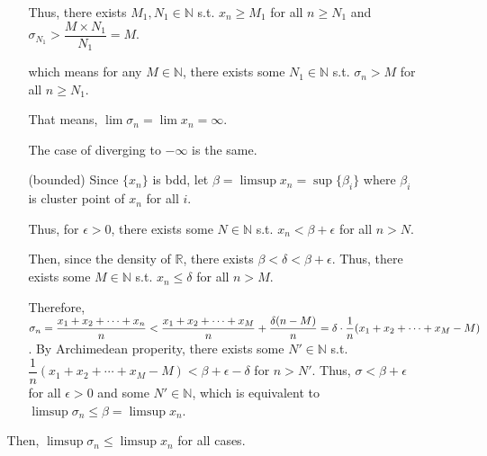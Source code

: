 \documentclass[12pt]{article}
\begin{document}
\begin{enumerate}
\begin{enumerate}[(a)]
\begin{enumerate}
            Thus, there exists $M_1, N_1 \in \mathbb{N}$ s.t. $x_n \geq M_1$ for all $n \geq N_1$ and $\sigma_{N_1} > \dfrac{M\times N_1}{N_1} = M$.

            which means for any $M \in \mathbb{N}$, there exists some $N_1 \in \mathbb{N}$ s.t. $\sigma_n > M$ for all $n \geq N_1$.

            That means, $\lim \sigma_n = \lim x_n = \infty$.

            The case of diverging to $-\infty$ is the same.

            \item[(bounded)] Since $\lbrace x_n\rbrace$ is bdd, let $\beta = \limsup x_n = \sup\lbrace \beta_i\rbrace$ where $\beta_i$ is cluster point of $x_n$ for all $i$.
            
            Thus, for $\epsilon > 0$, there exists some $N \in \mathbb{N}$ s.t. $x_n < \beta + \epsilon$ for all $n > N$.

            Then, since the density of $\mathbb{R}$, there exists $\beta < \delta < \beta + \epsilon$.
            Thus, there exists some $M\in \mathbb{N}$ s.t. $x_n \leq \delta$ for all $n > M$.

            Therefore, $\sigma_n = \dfrac{x_1 + x_2 + \cdots + x_n}{n} < \dfrac{x_1 + x_2 + \cdots + x_M}{n} + \dfrac{\delta(n-M)}{n}\\
             = \delta \cdot \dfrac{1}{n}(x_1 + x_2 + \cdots + x_M - M)$.
            By Archimedean properity, there exists some $N' \in \mathbb{N}$ s.t. $\dfrac{1}{n}(x_1 + x_2 + \cdots + x_M - M) < \beta + \epsilon - \delta$ for $n > N'$.
            Thus, $\sigma < \beta + \epsilon$ for all $\epsilon > 0$ and some $N'\in \mathbb{N}$, which is equivalent to $\limsup \sigma_n \leq \beta = \limsup x_n$.

        \end{enumerate}
        
        Then, $\limsup \sigma_n \leq \limsup x_n$ for all cases.
    \end{enumerate}
\end{enumerate}
\end{document}
